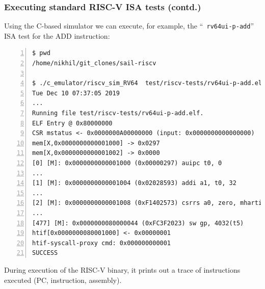 \documentclass[aspectratio=169]{beamer}
\newcommand{\slidefont}{\scriptsize}
\begin{document}
\begin{frame}[fragile]
  \frametitle{Executing standard RISC-V ISA tests (contd.)}

  \slidefont

  Using the C-based simulator we can execute, for example, the ``{\tt
    rv64ui-p-add}'' ISA test for the ADD instruction:

  \vspace{1ex}

  \tiny
  \begin{Verbatim}[frame=single, numbers=left, label = in your sail-riscv repository clone]
$ pwd
/home/nikhil/git_clones/sail-riscv

$ ./c_emulator/riscv_sim_RV64  test/riscv-tests/rv64ui-p-add.elf
Tue Dec 10 07:37:05 2019
...
Running file test/riscv-tests/rv64ui-p-add.elf.
ELF Entry @ 0x80000000
CSR mstatus <- 0x0000000A00000000 (input: 0x0000000000000000)
mem[X,0x0000000000001000] -> 0x0297
mem[X,0x0000000000001002] -> 0x0000
[0] [M]: 0x0000000000001000 (0x00000297) auipc t0, 0
...
[1] [M]: 0x0000000000001004 (0x02028593) addi a1, t0, 32
...
[2] [M]: 0x0000000000001008 (0xF1402573) csrrs a0, zero, mhartid
...
[477] [M]: 0x0000000080000044 (0xFC3F2023) sw gp, 4032(t5)
htif[0x0000000080001000] <- 0x00000001
htif-syscall-proxy cmd: 0x000000000001
SUCCESS
  \end{Verbatim}

  \slidefont
  During execution of the RISC-V binary, it prints out a trace of instructions executed (PC, instruction, assembly).

\end{frame}

\end{document}
